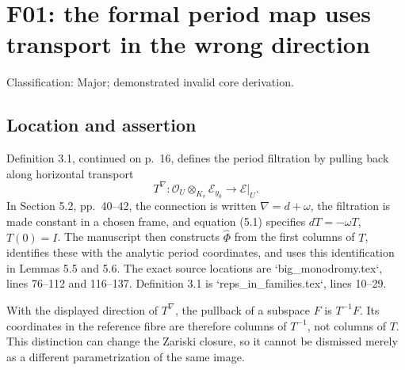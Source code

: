 \documentclass[10pt]{article}
\begin{document}
\section*{F01: the formal period map uses transport in the wrong direction}
Classification: Major; demonstrated invalid core derivation.\par
\subsection*{Location and assertion}
Definition 3.1, continued on p. 16, defines the period filtration by pulling back along horizontal transport \[T^\nabla:\mathcal O_U\otimes_{K_v}\mathcal E_{y_0}\longrightarrow \mathcal E|_U.\] In Section 5.2, pp. 40–42, the connection is written \(\nabla=d+\omega\), the filtration is made constant in a chosen frame, and equation (5.1) specifies \(dT=-\omega T\), \(T(0)=I\). The manuscript then constructs \(\widehat\Phi\) from the first columns of \(T\), identifies these with the analytic period coordinates, and uses this identification in Lemmas 5.5 and 5.6. The exact source locations are `big\_monodromy.tex`, lines 76–112 and 116–137. Definition 3.1 is `reps\_in\_families.tex`, lines 10–29.\par
With the displayed direction of \(T^\nabla\), the pullback of a subspace \(F\) is \(T^{-1}F\). Its coordinates in the reference fibre are therefore columns of \(T^{-1}\), not columns of \(T\). This distinction can change the Zariski closure, so it cannot be dismissed merely as a different parametrization of the same image.\par
\end{document}
